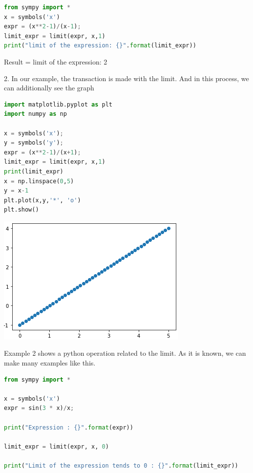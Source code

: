 \documentclass[11pt] {article}
\begin{document}
\begin{lstlisting}[language=Python]
from sympy import *
x = symbols('x')
expr = (x**2-1)/(x-1);
limit_expr = limit(expr, x,1)
print("limit of the expression: {}".format(limit_expr))
\end{lstlisting}

\begin{center}
Result = limit of the expression: 2
\end{center}

\vspace{120mm} %
\begin{center}
2. In our example, the transaction is made with the limit. And in this process, we can additionally see the graph
\end{center}

\begin{lstlisting}[language=Python]
import matplotlib.pyplot as plt
import numpy as np

x = symbols('x');
y = symbols('y');
expr = (x**2-1)/(x+1);
limit_expr = limit(expr, x,1)
print(limit_expr)
x = np.linspace(0,5)
y = x-1
plt.plot(x,y,'*', 'o')
plt.show()
\end{lstlisting}

\begin{center}
\includegraphics[scale = 1]{img2}
\end{center}

\vspace{150mm} %
\begin{center}
Example 2 shows a python operation related to the limit. As it is known, we can make many examples like this.
\end{center}
\begin{lstlisting}[language=Python]
from sympy import * 
  
x = symbols('x') 
expr = sin(3 * x)/x; 
    
print("Expression : {}".format(expr))  
      
limit_expr = limit(expr, x, 0)   
      
print("Limit of the expression tends to 0 : {}".format(limit_expr))
\end{lstlisting}
\end{document}

